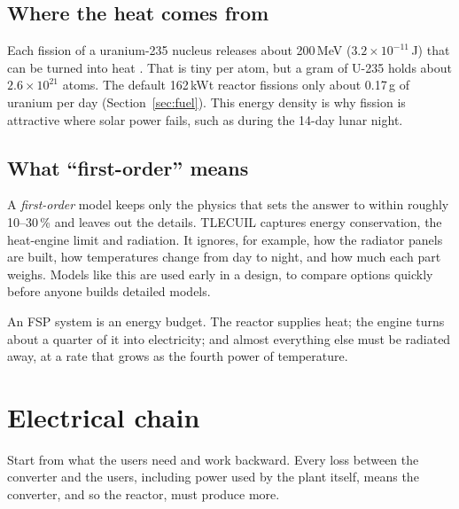 \documentclass[11pt]{article}
\numberwithin{equation}{section}
\numberwithin{table}{section}
\begin{document}
\subsection{Where the heat comes from}
Each fission of a uranium-235 nucleus releases about 200\,MeV ($3.2\times10^{-11}$\,J)
that can be turned into heat \cite{lamarsh2017}. That is tiny per atom, but a gram of
U-235 holds about $2.6\times10^{21}$ atoms. The default 162\,kWt reactor fissions only about
0.17\,g of uranium per day (Section~\ref{sec:fuel}). This energy density is why fission is
attractive where solar power fails, such as during the 14-day lunar night.

\subsection{What ``first-order'' means}
A \emph{first-order} model keeps only the physics that sets the answer to within
roughly 10--30\,\% and leaves out the details. TLECUIL captures energy conservation, the
heat-engine limit and radiation. It ignores, for example, how the radiator panels are
built, how temperatures change from day to night, and how much each part weighs. Models
like this are used early in a design, to compare options quickly before anyone builds
detailed models.

\begin{keyidea}
An FSP system is an energy budget. The reactor supplies heat; the engine turns about a
quarter of it into electricity; and almost everything else must be radiated away, at a
rate that grows as the fourth power of temperature.
\end{keyidea}

\section{Electrical chain}\label{sec:power}

\begin{keyidea}
Start from what the users need and work backward. Every loss between the converter and
the users, including power used by the plant itself, means the converter, and so the
reactor, must produce more.
\end{keyidea}
\end{document}
